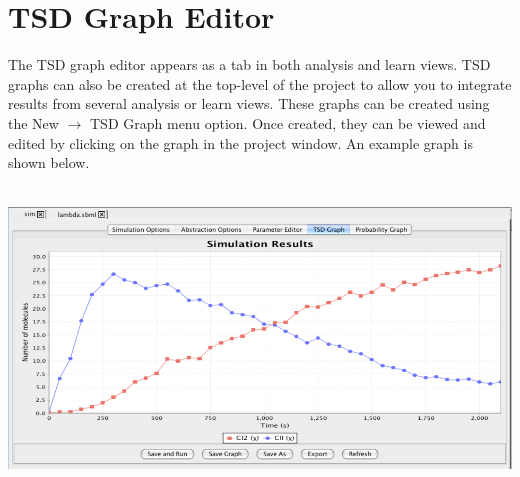 \documentclass[titlepage,11pt]{article}
\begin{document}
\section{\label{TSDEdit}TSD Graph Editor}

\noindent
The TSD graph editor appears as a tab in both analysis and learn
views.  TSD graphs can also be created at the top-level of the project
to allow you to integrate results from several analysis or learn
views. These graphs can be created using the New $\rightarrow$ TSD Graph
menu option. Once created, they can be viewed and edited by
clicking on the graph in the project window.  An example graph is
shown below.
\begin{center}
\includegraphics[height=80mm]{screenshots/TSDgraph}
\end{center}
\end{document}
